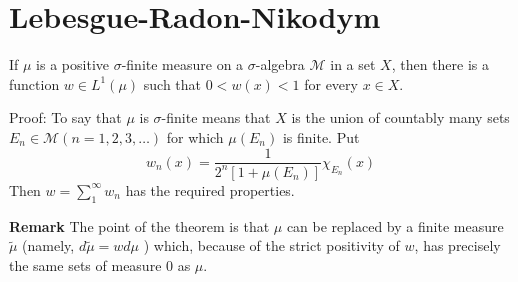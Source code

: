 \documentclass[12pt, a4paper, oneside]{book}
\begin{document}
\section{Lebesgue-Radon-Nikodym}
\begin{lemma}
    If $\mu$ is a positive $\sigma$-finite measure on a $\sigma$-algebra $\mathcal{M}$ in a set $X$, then there is a function $w \in L^1(\mu)$ such that $0<w(x)<1$ for every $x \in X$.

    Proof:
    To say that $\mu$ is $\sigma$-finite means that $X$ is the union of countably many sets $E_n \in \mathcal{M}(n=1,2,3, \ldots)$ for which $\mu\left(E_n\right)$ is finite. Put
    $$
        w_n(x)=\frac{1}{ 2^{n} [1+\mu\left(E_n\right)]}   \chi_{E_n}(x)
    $$
    Then $w=\sum\limits_1^{\infty} w_n$ has the required properties.

    \textbf{Remark} The point of the theorem is that $\mu$ can be replaced by a finite measure $\tilde{\mu}$ (namely, $d \tilde{\mu}=w d \mu$ ) which, because of the strict positivity of $w$, has precisely the same sets of measure 0 as $\mu$.
\end{lemma}
\end{document}
